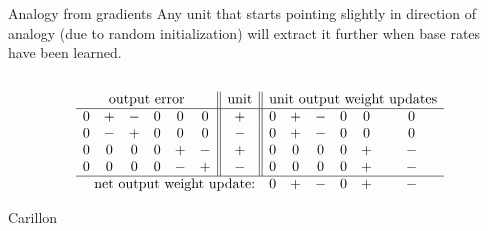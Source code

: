\documentclass{beamer}
\begin{document}
\begin{frame}[allowframebreaks]


\end{frame}

\appendix
\begin{frame}{Analogy from gradients}
Any unit that starts pointing slightly in direction of analogy (due to random initialization) will extract it further when base rates have been learned.\\[11pt]
\begin{columns}
\end{columns} 
{ 
\[
\begin{array}{cccccc||c||cccccc} 
\multicolumn{6}{c||}{\text{output error}}  & \text{unit}  & \multicolumn{6}{c}{\text{unit output weight updates}} \\
\hline
 0 & + & - & 0 & 0 & 0  &   +    &  0 & + & - & 0 & 0 & 0   \\
0 & - & + & 0 & 0 & 0  &   -  & 0 & + & - & 0 & 0 & 0   \\
 0 & 0 & 0 & 0 & + & - &   +   &  0 & 0 & 0 & 0 & + & - \\
 0 & 0 & 0 & 0 & - & +  &  - &  0 & 0 & 0 & 0 & + & - \\
\hline
\multicolumn{7}{r}{\text{net output weight update:}} &   0 & + & - & 0 & + & - \\
\end{array} 
\]
}
\end{frame}

\begin{frame}{Carillon}
\begin{center}
\end{center}
\end{frame}
\end{document}
